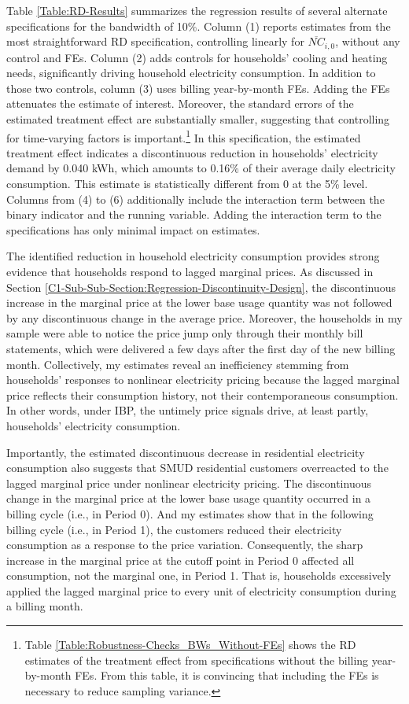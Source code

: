 
Table \ref{Table:RD-Results} summarizes the regression results of several alternate specifications for the bandwidth of 10\%. Column (1) reports estimates from the most straightforward RD specification, controlling linearly for $\overline{NC}_{i, 0}$, without any control and FEs. Column (2) adds controls for households' cooling and heating needs, significantly driving household electricity consumption. In addition to those two controls, column (3) uses billing year-by-month FEs. Adding the FEs attenuates the estimate of interest. Moreover, the standard errors of the estimated treatment effect are substantially smaller, suggesting that controlling for time-varying factors is important.\footnote{Table \ref{Table:Robustness-Checks_BWs_Without-FEs} shows the RD estimates of the treatment effect from specifications without the billing year-by-month FEs. From this table, it is convincing that including the FEs is necessary to reduce sampling variance.} In this specification, the estimated treatment effect indicates a discontinuous reduction in households' electricity demand by 0.040 kWh, which amounts to 0.16\% of their average daily electricity consumption. This estimate is statistically different from 0 at the 5\% level. Columns from (4) to (6) additionally include the interaction term between the binary indicator and the running variable. Adding the interaction term to the specifications has only minimal impact on estimates. 

The identified reduction in household electricity consumption provides strong evidence that households respond to lagged marginal prices. As discussed in Section \ref{C1-Sub-Sub-Section:Regression-Discontinuity-Design}, the discontinuous increase in the marginal price at the lower base usage quantity was not followed by any discontinuous change in the average price. Moreover, the households in my sample were able to notice the price jump only through their monthly bill statements, which were delivered a few days after the first day of the new billing month. Collectively, my estimates reveal an inefficiency stemming from households' responses to nonlinear electricity pricing because the lagged marginal price reflects their consumption history, not their contemporaneous consumption. In other words, under IBP, the untimely price signals drive, at least partly, households' electricity consumption. 

Importantly, the estimated discontinuous decrease in residential electricity consumption also suggests that SMUD residential customers overreacted to the lagged marginal price under nonlinear electricity pricing. The discontinuous change in the marginal price at the lower base usage quantity occurred in a billing cycle (i.e., in Period 0). And my estimates show that in the following billing cycle (i.e., in Period 1), the customers reduced their electricity consumption as a response to the price variation. Consequently, the sharp increase in the marginal price at the cutoff point in Period 0 affected all consumption, not the marginal one, in Period 1. That is, households excessively applied the lagged marginal price to every unit of electricity consumption during a billing month. 

